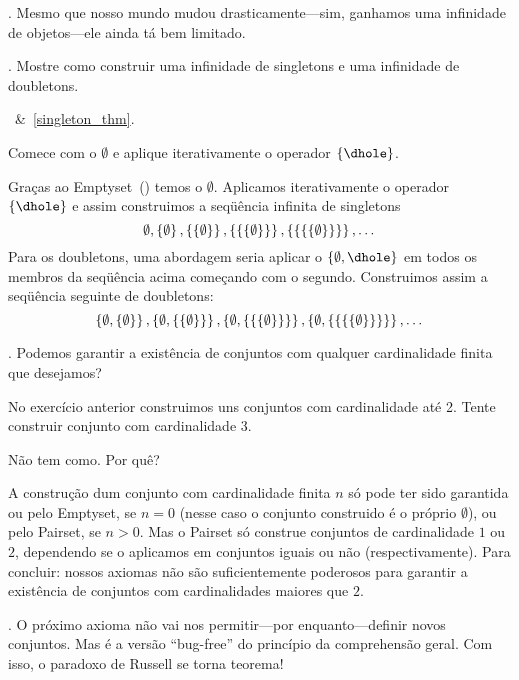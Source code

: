 \blah.
Mesmo que nosso mundo mudou drasticamente---sim, ganhamos uma infinidade de
objetos---ele ainda tá bem limitado.

\exercise.
Mostre como construir uma infinidade de singletons e uma infinidade de doubletons.

\hint
{}~\&~\ref{singleton_thm}.

\hint
Comece com o $\emptyset$ e aplique iterativamente o operador $\set{\dhole}$.

\solution
Graças ao Emptyset~() temos o $\emptyset$.
Aplicamos iterativamente o operador $\set{\dhole}$ e assim construimos
a seqüência infinita de singletons
$$
\emptyset,
\left\{\emptyset\right\},
\left\{\left\{\emptyset\right\}\right\},
\left\{\left\{\left\{\emptyset\right\}\right\}\right\},
\left\{\left\{\left\{\left\{\emptyset\right\}\right\}\right\}\right\},
\dotsc
$$
Para os doubletons, uma abordagem seria aplicar o $\set{\emptyset,\dhole}$
em todos os membros da seqüência acima começando com o segundo.
Construimos assim a seqüência seguinte de doubletons:
$$
\left\{\emptyset, \left\{\emptyset\right\}\right\},
\left\{\emptyset, \left\{\left\{\emptyset\right\}\right\}\right\},
\left\{\emptyset, \left\{\left\{\left\{\emptyset\right\}\right\}\right\}\right\},
\left\{\emptyset, \left\{\left\{\left\{\left\{\emptyset\right\}\right\}\right\}\right\}\right\},
\dotsc
$$

\endexercise

\exercise.
\label{only_sets_with_up_to_two_elements}%
Podemos garantir a existência de conjuntos com qualquer cardinalidade finita que desejamos?

\hint
No exercício anterior construimos uns conjuntos com cardinalidade até 2.
Tente construir conjunto com cardinalidade 3.

\hint
Não tem como.  Por quê?

\solution
A construção dum conjunto com cardinalidade finita $n$ só pode ter sido garantida
ou pelo Emptyset, se $n=0$ (nesse caso o conjunto construido é o próprio $\emptyset$),
ou pelo Pairset, se $n>0$.  Mas o Pairset só construe
conjuntos de cardinalidade $1$ ou $2$, dependendo se o aplicamos em conjuntos
iguais ou não (respectivamente).
Para concluir: nossos axiomas não são suficientemente poderosos para garantir
a existência de conjuntos com cardinalidades maiores que $2$.

\endexercise

\note.
O próximo axioma não vai nos permitir---por enquanto---definir novos conjuntos.
Mas é a versão ``bug-free'' do princípio da comprehensão geral.
Com isso, o paradoxo de Russell se torna teorema!

